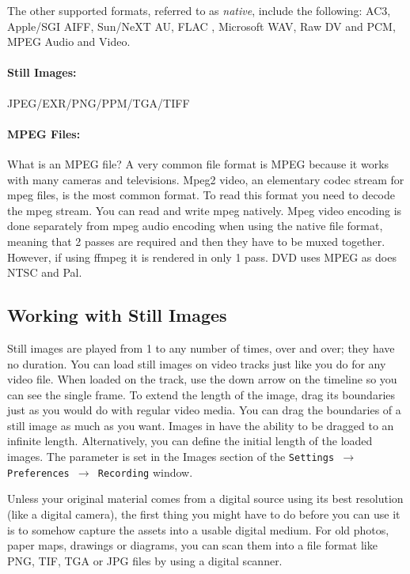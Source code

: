 The other supported formats, referred to as \textit{native},  include the following:
AC3, 
Apple/SGI AIFF,
Sun/NeXT AU,
FLAC ,
Microsoft WAV,
Raw DV and PCM,
MPEG Audio and Video.

\paragraph{Still Images:}  JPEG/EXR/PNG/PPM/TGA/TIFF

\paragraph{MPEG Files:} 
What is an MPEG file?  A very common file format is MPEG because it works with many cameras and televisions.  Mpeg2 video, an elementary codec stream for mpeg files, is the most common format.  To read this format you need to decode the mpeg stream.  You can read and write mpeg natively.  Mpeg video encoding is done separately from mpeg audio encoding when using the native file format, meaning that 2 passes are required and then they have to be muxed together.  However, if using ffmpeg it is rendered in only 1 pass.  DVD uses MPEG as does NTSC and Pal.

\subsection{Working with Still Images}%
\label{sub:working_with_still_images}

Still images are played from 1 to any number of times, over and over; they have no duration. You can load still images on video tracks just like you do for any video file. When loaded on the track, use the down arrow on the timeline so you can see the single frame. To extend the length of the image, drag its boundaries just as you would do with regular video media. You can drag the boundaries of a still image as much as you want. Images in \CGG{} have the ability to be dragged to an infinite length. Alternatively, you can define the initial length of the loaded images. The parameter is set in the Images section of the \texttt{Settings $\rightarrow$ Preferences $\rightarrow$ Recording} window.

Unless your original material comes from a digital source using its best resolution (like a digital camera), the first thing you might have to do before you can use it is to somehow capture the assets into a usable digital medium. For old photos, paper maps, drawings or diagrams, you can scan them into a file format like PNG, TIF, TGA or JPG files by using a digital scanner.

